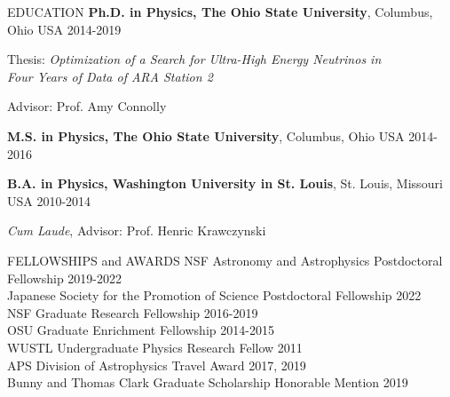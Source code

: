 \documentclass{resume} %
\newenvironment{list1}{
  \begin{list}{\ding{113}}{%
      \setlength{\itemsep}{0in}
      \setlength{\parsep}{0in} \setlength{\parskip}{0in}
      \setlength{\topsep}{0in} \setlength{\partopsep}{0in} 
      \setlength{\leftmargin}{0.17in}}}{\end{list}}
\begin{document}


\begin{rSection}{EDUCATION}
\textbf{Ph.D. in Physics, The Ohio State University}, Columbus, Ohio USA \hfill 2014-2019\\
\vspace*{-.15in}
\begin{list1}
\item[]Thesis: \textit{Optimization of a Search for Ultra-High Energy Neutrinos in \\ Four Years of Data of ARA Station 2} 
\item[]Advisor: Prof. Amy Connolly
\end{list1}

\textbf{M.S. in Physics, The Ohio State University}, Columbus, Ohio USA \hfill 2014-2016

\textbf{B.A. in Physics, Washington University in St. Louis}, St. Louis, Missouri USA \hfill 2010-2014\\
\vspace*{-.15in}
\begin{list1}
\item[] \textit{Cum Laude}, Advisor: Prof. Henric Krawczynski
\end{list1}
\end{rSection}



\begin{rSection}{FELLOWSHIPS and AWARDS}
NSF Astronomy and Astrophysics Postdoctoral Fellowship \hfill 2019-2022 \\
Japanese Society for the Promotion of Science Postdoctoral Fellowship \hfill 2022 \\
NSF Graduate Research Fellowship \hfill 2016-2019 \\
OSU Graduate Enrichment Fellowship \hfill 2014-2015 \\
WUSTL Undergraduate Physics Research Fellow \hfill 2011 \\
APS Division of Astrophysics Travel Award \hfill 2017, 2019 \\
Bunny and Thomas Clark Graduate Scholarship Honorable Mention \hfill 2019


\end{rSection}
\end{document}
